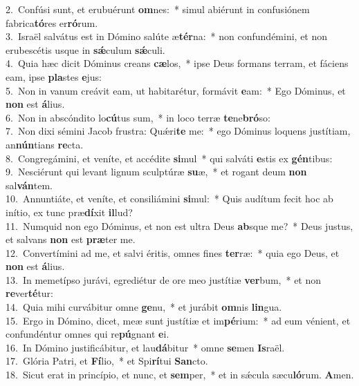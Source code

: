 {2.~}Confúsi sunt, et erubuérunt \textbf{om}nes:~* simul abiérunt in confusiónem fabrica\textbf{tó}res er\textbf{ró}rum.\\
{3.~}Israël salvátus est in Dómino salúte æ\textbf{tér}na:~* non confundémini, et non erubescétis usque in \textbf{sǽ}culum \textbf{sǽ}culi.\\
{4.~}Quia hæc dicit Dóminus creans \textbf{cæ}los,~* ipse Deus formans terram, et fáciens eam, ipse \textbf{pla}stes \textbf{e}jus:\\
{5.~}Non in vanum creávit eam, ut habitarétur, formávit \textbf{e}am:~* Ego Dóminus, et \textbf{non} est \textbf{á}lius.\\
{6.~}Non in abscóndito lo\textbf{cú}tus sum,~* in loco terræ \textbf{te}ne\textbf{bró}so:\\
{7.~}Non dixi sémini Jacob frustra: Quǽri\textbf{te} me:~* ego Dóminus loquens justítiam, an\textbf{nún}tians \textbf{re}cta.\\
{8.~}Congregámini, et veníte, et accédite \textbf{si}mul~* qui salváti \textbf{e}stis ex \textbf{gén}tibus:\\
{9.~}Nesciérunt qui levant lignum sculptúræ \textbf{su}æ,~* et rogant deum \textbf{non} sal\textbf{ván}tem.\\
{10.~}Annuntiáte, et veníte, et consiliámini \textbf{si}mul:~* Quis audítum fecit hoc ab inítio, ex tunc præ\textbf{dí}xit \textbf{il}lud?\\
{11.~}Numquid non ego Dóminus, et non est ultra Deus \textbf{ab}sque me?~* Deus justus, et salvans \textbf{non} est \textbf{præ}ter me.\\
{12.~}Convertímini ad me, et salvi éritis, omnes fines \textbf{ter}ræ:~* quia ego Deus, et \textbf{non} est \textbf{á}lius.\\
{13.~}In memetípso jurávi, egrediétur de ore meo justítiæ \textbf{ver}bum,~* et non \textbf{re}ver\textbf{té}tur:\\
{14.~}Quia mihi curvábitur omne \textbf{ge}nu,~* et jurábit \textbf{om}nis \textbf{lin}gua.\\
{15.~}Ergo in Dómino, dicet, meæ sunt justítiæ et im\textbf{pé}rium:~* ad eum vénient, et confundéntur omnes qui re\textbf{pú}gnant \textbf{e}i.\\
{16.~}In Dómino justificábitur, et lau\textbf{dá}bitur~* omne \textbf{se}men \textbf{Is}raël.\\
{17.~}Glória Patri, et \textbf{Fí}lio,~* et Spi\textbf{rí}tui \textbf{San}cto.\\
{18.~}Sicut erat in princípio, et nunc, et \textbf{sem}per,~* et in sǽcula sæcu\textbf{ló}rum. \textbf{A}men.\\
